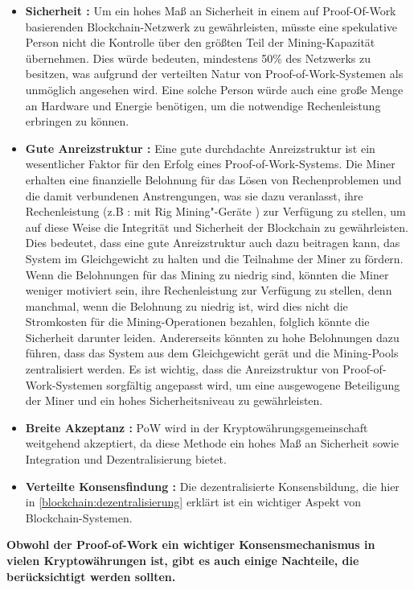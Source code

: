\documentclass[ngerman]{scrreprt}
\begin{document}
\begin{itemize}
	\item \textbf{Sicherheit :} Um ein hohes Maß an Sicherheit in einem auf Proof-Of-Work basierenden Blockchain-Netzwerk zu gewährleisten, müsste eine spekulative Person nicht die Kontrolle über den größten Teil der Mining-Kapazität übernehmen. Dies würde bedeuten, mindestens 50\% des Netzwerks zu besitzen, was aufgrund der verteilten Natur von Proof-of-Work-Systemen als unmöglich angesehen wird. Eine solche Person würde auch eine große Menge an Hardware und Energie benötigen, um die notwendige Rechenleistung erbringen zu können.
	
	
	\item \textbf{Gute Anreizstruktur :} Eine gute durchdachte Anreizstruktur ist ein wesentlicher Faktor für den Erfolg eines Proof-of-Work-Systems. Die Miner erhalten eine finanzielle Belohnung für das Lösen von Rechenproblemen und die damit verbundenen Anstrengungen, was sie dazu veranlasst, ihre Rechenleistung (z.B : mit Rig Mining"-Geräte ) zur Verfügung zu stellen, um auf diese Weise die Integrität und Sicherheit der Blockchain zu gewährleisten. Dies bedeutet, dass eine gute Anreizstruktur auch dazu beitragen kann, das System im Gleichgewicht zu halten und die Teilnahme der Miner zu fördern. Wenn die Belohnungen für das Mining zu niedrig sind, könnten die Miner weniger motiviert sein, ihre Rechenleistung zur Verfügung zu stellen, denn manchmal, wenn die Belohnung zu niedrig ist, wird dies nicht die Stromkosten für die Mining-Operationen bezahlen, folglich könnte die Sicherheit darunter leiden. Andererseits könnten zu hohe Belohnungen dazu führen, dass das System aus dem Gleichgewicht gerät und die Mining-Pools zentralisiert werden. Es ist wichtig, dass die Anreizstruktur von Proof-of-Work-Systemen sorgfältig angepasst wird, um eine ausgewogene Beteiligung der Miner und ein hohes Sicherheitsniveau zu gewährleisten.
	
	
	\item \textbf{Breite Akzeptanz :} PoW wird in der Kryptowährungsgemeinschaft weitgehend akzeptiert, da diese Methode ein hohes Maß an Sicherheit sowie Integration und Dezentralisierung bietet.
	
	\item \textbf{Verteilte Konsensfindung :} Die dezentralisierte Konsensbildung, die hier in \cref{blockchain:dezentralisierung} erklärt ist ein wichtiger Aspekt von Blockchain-Systemen. \\
\end{itemize}
\textbf{Obwohl der Proof-of-Work ein wichtiger Konsensmechanismus in vielen Kryptowährungen ist, gibt es auch einige Nachteile, die berücksichtigt werden sollten.}
\end{document}
